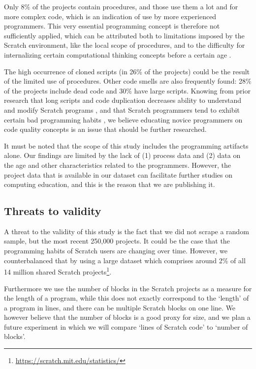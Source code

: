 \documentclass{sig-alternate-05-2015}
\begin{document}
Only 8\% of the projects contain procedures, and those use them a lot and for more complex code, which is an indication of use by more experienced programmers. This very essential programming concept is therefore not sufficiently applied, which can be attributed both to limitations imposed by the Scratch environment, like the local scope of procedures, and to the difficulty for internalizing certain computational thinking concepts before a certain age \cite{seiter_2013}.

The high occurrence of cloned scripts (in 26\% of the proj\-ects) could be the result of the limited use of procedures. Other code smells are also frequently found: 28\% of the projects include dead code and 30\% have large scripts. Knowing from prior research that long scripts and code duplication decreases ability to understand and modify Scratch programs \cite{hermans_2016}, and that Scratch programmers tend to exhibit certain bad programming habits \cite{Meerbaum_habits_2011}, we believe educating novice programmers on code quality concepts is an issue that should be further researched.

It must be noted that the scope of this study includes the programming artifacts alone. Our findings are limited by the lack of (1) process data and (2) data on the age and other characteristics related to the programmers. However, the project data that is available in our dataset can facilitate further studies on computing education, and this is the reason that we are publishing it.

\subsection{Threats to validity}
A threat to the validity of this study is the fact that we did not scrape a random sample, but the most recent 250,000 projects. It could be the case that the programming habits of Scratch users are changing over time. However, we counterbalanced that by using a large dataset which comprises around 2\% of all 14 million shared Scratch projects\footnote{\url{https://scratch.mit.edu/statistics/}}.

Furthermore we use the number of blocks in the Scratch projects as a measure for the length of a program, while this does not exactly correspond to the `length' of a program in lines, and there can be multiple Scratch blocks on one line. We however believe that the number of blocks is a good proxy for size, and we plan a future experiment in which we will compare `lines of Scratch code' to `number of blocks'.
\end{document}
